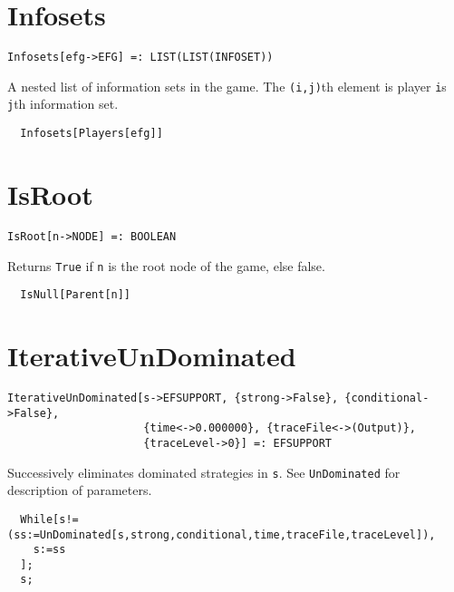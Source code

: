 
\section*{Infosets}\label{ExtInfosets}
\begin{verbatim}
Infosets[efg->EFG] =: LIST(LIST(INFOSET)) 
\end{verbatim}

\noindent
A nested list of information sets in the game. The \verb+(i,j)+th
element is player \verb+i+s \verb+j+th information set.  

\udfbody
\begin{verbatim}
  Infosets[Players[efg]]
\end{verbatim} 


\section*{IsRoot}\label{ExtIsRoot}
\begin{verbatim}
IsRoot[n->NODE] =: BOOLEAN 
\end{verbatim}

\noindent
Returns \verb+True+ if \verb+n+ is the root node of the game, else
false.  

\udfbody
\begin{verbatim}
  IsNull[Parent[n]]
\end{verbatim} 


\section*{IterativeUnDominated}\label{ExtIterativeUnDominated}
\begin{verbatim}
IterativeUnDominated[s->EFSUPPORT, {strong->False}, {conditional->False}, 
                     {time<->0.000000}, {traceFile<->(Output)}, 
                     {traceLevel->0}] =: EFSUPPORT 
\end{verbatim}

\noindent
Successively eliminates dominated strategies in \verb+s+. See
\verb+UnDominated+ for description of parameters.  

\udfbody
\begin{verbatim}
  While[s!=(ss:=UnDominated[s,strong,conditional,time,traceFile,traceLevel]),
    s:=ss
  ];
  s;
\end{verbatim} 

